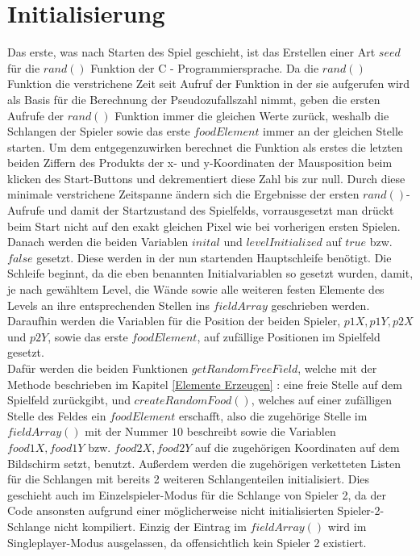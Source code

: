 \section{Initialisierung}
\label{Initialisierung}
%
Das erste, was nach Starten des Spiel geschieht, ist das Erstellen einer Art $seed$ f{\"u}r die $rand()$ Funktion der C - Programmiersprache. Da die $rand()$ Funktion die verstrichene Zeit seit Aufruf der Funktion in der sie aufgerufen wird als Basis f{\"u}r die Berechnung der Pseudozufallszahl nimmt, geben die ersten Aufrufe der $rand()$ Funktion immer die gleichen Werte zur{\"u}ck, weshalb die Schlangen der Spieler sowie das erste $foodElement$ immer an der gleichen Stelle starten. Um dem entgegenzuwirken berechnet die Funktion als erstes die letzten beiden Ziffern des Produkts der x- und y-Koordinaten der Mausposition beim klicken des Start-Buttons und dekrementiert diese Zahl bis zur null. Durch diese minimale verstrichene Zeitspanne {\"a}ndern sich die Ergebnisse der ersten $rand()$-Aufrufe und damit der Startzustand des Spielfelds, vorrausgesetzt man dr{\"u}ckt beim Start nicht auf den exakt gleichen Pixel wie bei vorherigen ersten Spielen. Danach werden die beiden Variablen $inital$ und $levelInitialized$ auf $true$ bzw. $false$ gesetzt. Diese werden in der nun startenden Hauptschleife benötigt. Die Schleife beginnt, da die eben benannten Initialvariablen so gesetzt wurden, damit, je nach gew{\"a}hltem Level, die W{\"a}nde sowie alle weiteren festen Elemente des Levels an ihre entsprechenden Stellen ins $fieldArray$ geschrieben werden. Daraufhin werden die Variablen f{\"u}r die Position der beiden Spieler, $p1X, p1Y, p2X$ und $p2Y$, sowie das erste $foodElement$, auf zuf{\"a}llige Positionen im Spielfeld gesetzt. \\
 Dafür werden die beiden Funktionen $getRandomFreeField$, welche mit der Methode beschrieben im Kapitel \ref{Elemente Erzeugen}  :  eine freie Stelle auf dem Spielfeld zurückgibt, und $createRandomFood()$, welches auf einer zufälligen Stelle des Feldes ein $foodElement$ erschafft, also die zugehörige Stelle im $fieldArray()$ mit der Nummer $10$ beschreibt sowie die Variablen $food1X, food1Y$ bzw. $food2X, food2Y$ auf die zugehörigen Koordinaten auf dem Bildschirm setzt, benutzt. Außerdem werden die zugeh{\"o}rigen verketteten Listen f{\"u}r die Schlangen mit bereits 2 weiteren \glqq Schlangenteilen\grqq{} initialisiert. Dies geschieht auch im Einzelspieler-Modus f{\"u}r die Schlange von Spieler 2, da der Code ansonsten aufgrund einer m{\"o}glicherweise nicht initialisierten Spieler-2-Schlange nicht kompiliert. Einzig der Eintrag im $fieldArray()$  wird im Singleplayer-Modus ausgelassen, da offensichtlich kein Spieler 2 existiert. \\
